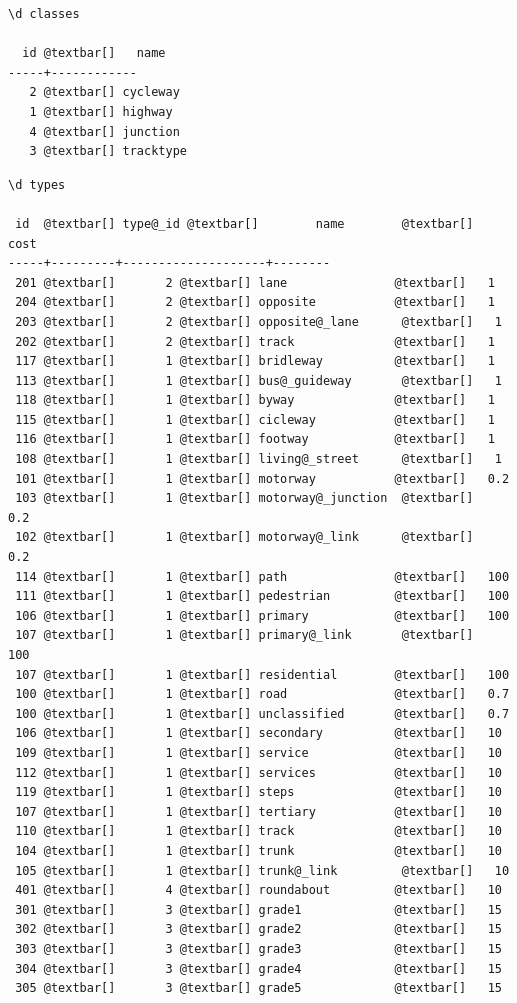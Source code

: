 \documentclass[a4paper,10pt,english]{manual}
\begin{document}
\begin{Verbatim}[commandchars=@\[\]]
\d classes

  id @textbar[]   name
-----+------------
   2 @textbar[] cycleway
   1 @textbar[] highway
   4 @textbar[] junction
   3 @textbar[] tracktype
\end{Verbatim}

\begin{Verbatim}[commandchars=@\[\]]
\d types

 id  @textbar[] type@_id @textbar[]        name        @textbar[]  cost
-----+---------+--------------------+--------
 201 @textbar[]       2 @textbar[] lane               @textbar[]   1
 204 @textbar[]       2 @textbar[] opposite           @textbar[]   1
 203 @textbar[]       2 @textbar[] opposite@_lane      @textbar[]   1
 202 @textbar[]       2 @textbar[] track              @textbar[]   1
 117 @textbar[]       1 @textbar[] bridleway          @textbar[]   1
 113 @textbar[]       1 @textbar[] bus@_guideway       @textbar[]   1
 118 @textbar[]       1 @textbar[] byway              @textbar[]   1
 115 @textbar[]       1 @textbar[] cicleway           @textbar[]   1
 116 @textbar[]       1 @textbar[] footway            @textbar[]   1
 108 @textbar[]       1 @textbar[] living@_street      @textbar[]   1
 101 @textbar[]       1 @textbar[] motorway           @textbar[]   0.2
 103 @textbar[]       1 @textbar[] motorway@_junction  @textbar[]   0.2
 102 @textbar[]       1 @textbar[] motorway@_link      @textbar[]   0.2
 114 @textbar[]       1 @textbar[] path               @textbar[]   100
 111 @textbar[]       1 @textbar[] pedestrian         @textbar[]   100
 106 @textbar[]       1 @textbar[] primary            @textbar[]   100
 107 @textbar[]       1 @textbar[] primary@_link       @textbar[]   100
 107 @textbar[]       1 @textbar[] residential        @textbar[]   100
 100 @textbar[]       1 @textbar[] road               @textbar[]   0.7
 100 @textbar[]       1 @textbar[] unclassified       @textbar[]   0.7
 106 @textbar[]       1 @textbar[] secondary          @textbar[]   10
 109 @textbar[]       1 @textbar[] service            @textbar[]   10
 112 @textbar[]       1 @textbar[] services           @textbar[]   10
 119 @textbar[]       1 @textbar[] steps              @textbar[]   10
 107 @textbar[]       1 @textbar[] tertiary           @textbar[]   10
 110 @textbar[]       1 @textbar[] track              @textbar[]   10
 104 @textbar[]       1 @textbar[] trunk              @textbar[]   10
 105 @textbar[]       1 @textbar[] trunk@_link         @textbar[]   10
 401 @textbar[]       4 @textbar[] roundabout         @textbar[]   10
 301 @textbar[]       3 @textbar[] grade1             @textbar[]   15
 302 @textbar[]       3 @textbar[] grade2             @textbar[]   15
 303 @textbar[]       3 @textbar[] grade3             @textbar[]   15
 304 @textbar[]       3 @textbar[] grade4             @textbar[]   15
 305 @textbar[]       3 @textbar[] grade5             @textbar[]   15
\end{Verbatim}
\end{document}
